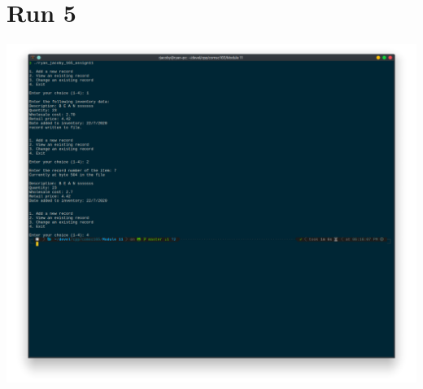 \documentclass[letterpaper, 11pt]{article}
\begin{document}
\section*{Run 5}
\includegraphics[scale=0.5]{run5.png}
\end{document}
